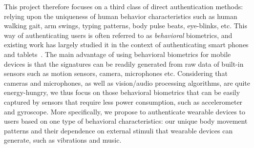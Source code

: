 This project therefore focuses on a third class of direct authentication methods: relying upon the uniqueness of human behavior characteristics such as human walking gait, arm swings, typing patterns, body pulse beats, eye-blinks, etc. This way of authenticating users is often referred to as \emph{behavioral} biometrics, and existing work has largely studied it in the context of authenticating smart phones and tablets~\cite{rahman2014bodybeat,cornelius2014wearable,stevenage1999visual,okumura2006study,monrose2000keystroke,jorgensen2011mouse,bo2013silentsense,de2012touch}. The main advantage of using behavioral biometrics for mobile devices is that the signatures can be readily generated from raw data of built-in sensors such as motion sensors, camera, microphones etc. Considering that cameras and microphones, as well as vision/audio processing algorithms, are quite energy-hungry, we thus focus on those behavioral biometrics that can be easily captured by sensors that require less power consumption, such as accelerometer and gyroscope. More specifically, we propose to authenticate wearable devices to users based on one type of behavioral characteristics: our unique body movement patterns and their dependence on external stimuli that wearable devices can generate, such as vibrations and music.

